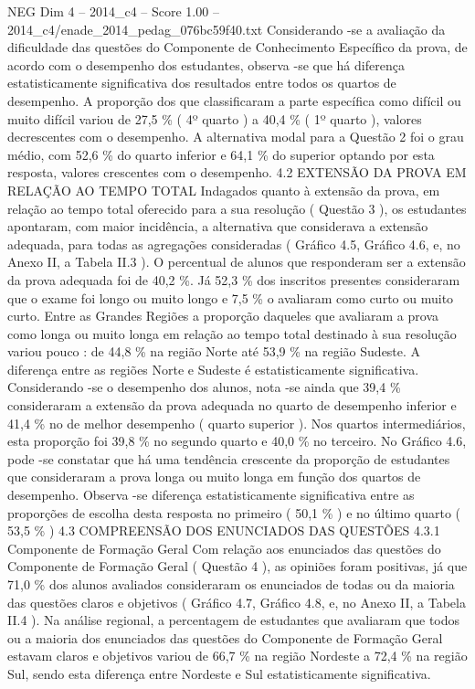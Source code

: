 \begin{textsample}{NEG Dim 4 – 2014\_c4 – Score 1.00 – 2014\_c4/enade\_2014\_pedag\_076bc59f40.txt}
Considerando -se a avaliação da dificuldade das questões do Componente de Conhecimento Específico da prova, de acordo com o desempenho dos estudantes, observa -se que há diferença estatisticamente significativa dos resultados entre todos os quartos de desempenho.
A proporção dos que classificaram a parte específica como difícil ou muito difícil variou de 27,5 \% ( 4º quarto ) a 40,4 \% ( 1º quarto ), valores decrescentes com o desempenho.
A alternativa modal para a Questão 2 foi o grau médio, com 52,6 \% do quarto inferior e 64,1 \% do superior optando por esta resposta, valores crescentes com o desempenho. 4.2 EXTENSÃO DA PROVA EM RELAÇÃO AO TEMPO TOTAL Indagados quanto à extensão da prova, em relação ao tempo total oferecido para a sua resolução ( Questão 3 ), os estudantes apontaram, com maior incidência, a alternativa que considerava a extensão adequada, para todas as agregações consideradas ( Gráfico 4.5, Gráfico 4.6, e, no Anexo II, a Tabela II.3 ).
O percentual de alunos que responderam ser a extensão da prova adequada foi de 40,2 \%.
Já 52,3 \% dos inscritos presentes consideraram que o exame foi longo ou muito longo e 7,5 \% o avaliaram como curto ou muito curto.
Entre as Grandes Regiões a proporção daqueles que avaliaram a prova como longa ou muito longa em relação ao tempo total destinado à sua resolução variou pouco : de 44,8 \% na região Norte até 53,9 \% na região Sudeste.
A diferença entre as regiões Norte e Sudeste é estatisticamente significativa.
Considerando -se o desempenho dos alunos, nota -se ainda que 39,4 \% consideraram a extensão da prova adequada no quarto de desempenho inferior e 41,4 \% no de melhor desempenho ( quarto superior ).
Nos quartos intermediários, esta proporção foi 39,8 \% no segundo quarto e 40,0 \% no terceiro.
No Gráfico 4.6, pode -se constatar que há uma tendência crescente da proporção de estudantes que consideraram a prova longa ou muito longa em função dos quartos de desempenho.
Observa -se diferença estatisticamente significativa entre as proporções de escolha desta resposta no primeiro ( 50,1 \% ) e no último quarto ( 53,5 \% ) 4.3 COMPREENSÃO DOS ENUNCIADOS DAS QUESTÕES 4.3.1 Componente de Formação Geral Com relação aos enunciados das questões do Componente de Formação Geral ( Questão 4 ), as opiniões foram positivas, já que 71,0 \% dos alunos avaliados consideraram os enunciados de todas ou da maioria das questões claros e objetivos ( Gráfico 4.7, Gráfico 4.8, e, no Anexo II, a Tabela II.4 ).
Na análise regional, a percentagem de estudantes que avaliaram que todos ou a maioria dos enunciados das questões do Componente de Formação Geral estavam claros e objetivos variou de 66,7 \% na região Nordeste a 72,4 \% na região Sul, sendo esta diferença entre Nordeste e Sul estatisticamente significativa.

\end{textsample}
